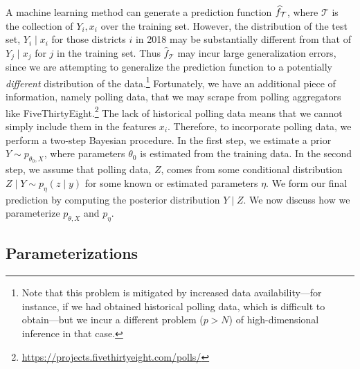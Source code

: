 \documentclass[12pt, letterpaper]{article}
\begin{document}
A machine learning method can generate a prediction function $\hat f_{\cal T}$,
where $\mathcal T$ is the collection of $Y_i, x_i$ over the training set.
However, the
distribution of the test set, $Y_i \mid x_i$ for those districts $i$ in 2018 may
be
substantially different from that of $Y_j \mid x_j$ for $j$ in the training
set. Thus $\hat f_{\mathcal T}$ may incur large generalization errors, since we
are attempting to generalize the prediction function to a potentially 
\emph{different}
distribution
of the data.\footnote{Note that this problem is mitigated by increased data
availability---for instance, if we had obtained historical polling data,
which is difficult to obtain---but we incur a different problem ($p > N$) of
high-dimensional
inference in that case.} Fortunately, we have an additional piece of
information, namely polling data, that we may scrape from polling aggregators
like
FiveThirtyEight.\footnote{\url{https://projects.fivethirtyeight.com/polls/}} The
lack of historical polling data means that we cannot simply include them in the
features $x_i$. Therefore, to incorporate polling data, we perform a two-step
Bayesian procedure. In the first step, we estimate a prior $Y \sim p_{\theta_0,
X}$, where parameters $\theta_0$ is estimated from the training data. In the
second step, we assume that polling data, $Z$, comes from some conditional
distribution $Z \mid Y \sim p_{\eta}(z\mid y)$ for some known or
estimated parameters
$\eta$. We form our final prediction by computing the posterior distribution $Y
\mid Z$. We now discuss how we parameterize $p_{\theta, X}$ and $p_\eta$.

\subsection{Parameterizations}
\end{document}
